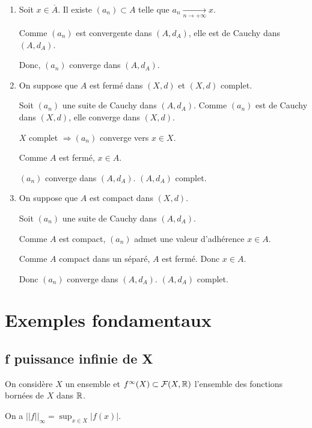 \documentclass[french,a4paper,10pt]{article}
\begin{document}
    \begin{myproof}\,
        \begin{enumerate}
            \item Soit $x\in \overline A$. Il existe $(a_n)\subset A$ telle que $a_n\xrightarrow[n\to+\infty]{}x$.

            Comme $(a_n)$ est convergente dans $(A,d_A)$, elle est de Cauchy dans $(A,d_A)$.

            Donc, $(a_n)$ converge dans $(A,d_A)$.

            \item On suppose que $A$ est fermé dans $(X,d)$ et $(X,d)$ complet.

            Soit $(a_n)$ une suite de Cauchy dans $(A,d_A)$. Comme $(a_n)$ est de Cauchy dans $(X,d)$, elle converge dans $(X,d)$.

            $X$ complet $\Rightarrow (a_n)$ converge vers $x\in X$.

            Comme $A$ est fermé, $x\in A$.

            $(a_n)$ converge dans $(A,d_A)$. $(A,d_A)$ complet.

            \item On suppose que $A$ est compact dans $(X,d)$.

            Soit $(a_n)$ une suite de Cauchy dans $(A,d_A)$.

            Comme $A$ est compact, $(a_n)$ admet une valeur d'adhérence $x\in A$.

            Comme $A$ compact dans un séparé, $A$ est fermé. Donc $x\in A$.

            Donc $(a_n)$ converge dans $(A,d_A)$. $(A,d_A)$ complet.
        \end{enumerate}
    \end{myproof}

    \section{Exemples fondamentaux}

    \subsection{f puissance infinie de X}

    On considère $X$ un ensemble et $f^\infty(X)\subset \mathcal F(X,\mathbb{R})$ l'ensemble des fonctions bornées de $X$ dans $\mathbb{R}$.

    On a $||f||_\infty = \sup_{x\in X}|f(x)|$.
\end{document}
